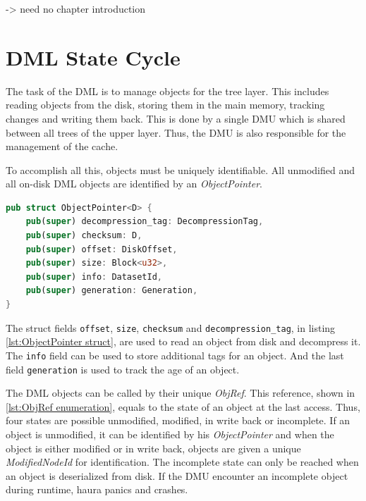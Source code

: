 \documentclass[
	12pt,
	a4paper,
	abstract,
	bibliography=totoc,
	chapterprefix,
	headings=openright,
	numbers=endperiod,
	parskip=half,
	twoside,
]{scrreprt}
\begin{document}

-> need no chapter introduction


\section{DML State Cycle}

The task of the DML is to manage objects for the tree layer. This includes reading objects from the disk, storing them in the main memory, tracking changes and writing them back.
This is done by a single DMU which is shared between all trees of the upper layer.
Thus, the DMU is also responsible for the management of the cache.

To accomplish all this, objects must be uniquely identifiable.
All unmodified and all on-disk DML objects are identified by an \emph{ObjectPointer}.

\bigskip
{}

\begin{lstlisting}[language=Rust,mathescape=true,caption=ObjectPointer struct ,label=lst:ObjectPointer struct]
pub struct ObjectPointer<D> {
    pub(super) decompression_tag: DecompressionTag,
    pub(super) checksum: D,
    pub(super) offset: DiskOffset,
    pub(super) size: Block<u32>,
    pub(super) info: DatasetId,
    pub(super) generation: Generation,
}
\end{lstlisting}

The struct fields \texttt{offset}, \texttt{size}, \texttt{checksum} and \texttt{decompression\_tag}, in listing \ref{lst:ObjectPointer struct}, are used to read an object from disk and decompress it.
The \texttt{info} field can be used to store additional tags for an object.
And the last field \texttt{generation} is used to track the age of an object.

The DML objects can be called by their unique \emph{ObjRef}.
This reference, shown in \ref{lst:ObjRef enumeration}, equals to the state of an object at the last access.
Thus, four states are possible unmodified, modified, in write back or incomplete.
If an object is unmodified, it can be identified by his \emph{ObjectPointer} and
when the object is either modified or in write back, objects are given a unique \emph{ModifiedNodeId} for identification.
The incomplete state can only be reached when an object is deserialized from disk.
If the DMU encounter an incomplete object during runtime, haura panics and crashes.
\end{document}
